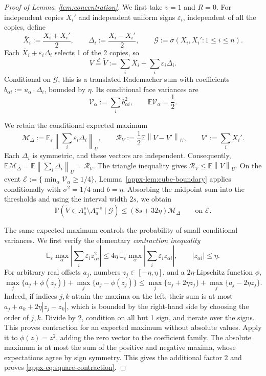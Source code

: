 \documentclass[11pt,letterpaper]{article}
\theoremstyle{remark}
\newcommand{\E}{\mathbb E}
\newcommand{\Pp}{\mathbb P}
\newcommand{\norm}[1]{\left\lVert#1\right\rVert}
\begin{document}
\begin{proof}[Proof of Lemma~\ref{lem:concentration}]
We first take \(v=1\) and \(R=0\). For independent copies \(X_i'\)
and independent uniform signs \(\varepsilon_i\), independent of
all the copies, {define}
\[
 \bar X_i:=\frac{X_i+X_i'}2,\qquad
 \Delta_i:=\frac{X_i-X_i'}2,\qquad
 \mathcal G:=\sigma(X_i,X_i':1\le i\le n).
\]
Each \(\bar X_i+\varepsilon_i\Delta_i\) selects 1 of the 2 copies, so
\begin{equation}
 V\stackrel d=\widetilde V:=\sum_i\bar X_i+\sum_i\varepsilon_i\Delta_i.
 \label{appx-eq:pair-representation}
\end{equation}
Conditional on \(\mathcal G\), this is a translated Rademacher sum
with coefficients \(b_{\alpha i}:=u_\alpha\cdot\Delta_i\), bounded
by \(\eta\). Its conditional face variances are
{
\[
 \mathcal V_\alpha:=\sum_i b_{\alpha i}^2,
 \qquad \E \mathcal V_\alpha=\frac12.
\]
}

We retain the conditional expected maximum
\[
 \mathcal M_\Delta:=\E_\varepsilon
       \norm{\sum_i\varepsilon_i\Delta_i}_U,
 \qquad
 \mathcal R_V:=\frac12\E\norm{V-V'}_U,
 \qquad V':=\sum_iX_i'.
\]
Each \(\Delta_i\) is symmetric, and these vectors are independent.
Consequently,
\(\E\mathcal M_\Delta=\E\norm{\sum_i\Delta_i}_U=\mathcal R_V\).
The triangle inequality gives \(\mathcal R_V\le\E\norm{V}_U\).
On the event
\(\mathcal E:=\{\min_\alpha {\mathcal V_\alpha}\ge1/4\}\),
Lemma~\ref{appx-lem:cube-boundary} applies conditionally with
\(\sigma^2=1/4\) and \(b=\eta\). Absorbing the midpoint sum into
the thresholds and using the interval width \(2s\), we obtain
\begin{equation}
 \Pp(\widetilde V\in A_a^s\setminus A_a^{-s}\mid\mathcal G)
 \le(8s+32\eta)\mathcal M_\Delta
 \qquad\text{on }\mathcal E.
 \label{appx-eq:conditional-intrinsic-concentration}
\end{equation}

The same expected maximum controls the probability of small
conditional variances. We first verify the elementary
\emph{contraction inequality}
\begin{equation}
 \E_\varepsilon\max_\alpha
       \left|\sum_i\varepsilon_i z_{\alpha i}^2\right|
 \le4\eta\,\E_\varepsilon\max_\alpha
       \left|\sum_i\varepsilon_i z_{\alpha i}\right|,
 \qquad |z_{\alpha i}|\le\eta.
 \label{appx-eq:square-contraction}
\end{equation}
For arbitrary real offsets \(a_j\), numbers \(z_j\in[-\eta,\eta]\),
and a \(2\eta\)-Lipschitz function \(\phi\),
\[
 \max_j\{a_j+\phi(z_j)\}+\max_j\{a_j-\phi(z_j)\}
 \le\max_j\{a_j+2\eta z_j\}+\max_j\{a_j-2\eta z_j\}.
\]
Indeed, if indices \(j,k\) attain the maxima on the left, their
sum is at most \(a_j+a_k+2\eta|z_j-z_k|\), which is bounded by
the right-hand side by choosing the order of \(j,k\).
Divide by \(2\), condition on all but 1 sign, and iterate over
the signs. This proves contraction for an expected maximum without
absolute values. Apply it to \(\phi(z)=z^2\), adding the zero vector
to the coefficient family. The absolute maximum is at most the sum
of the positive and negative maxima, whose expectations agree by
sign symmetry. This gives the additional factor \(2\) and proves
\eqref{appx-eq:square-contraction}.


\end{proof}
\end{document}
